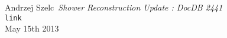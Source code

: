 


\newpage



\newpage



\newpage



\newpage



\newpage


\begin{thebibliography}{9}

Andrzej Szelc\
\emph{Shower Reconstruction Update : DocDB 2441}\\
\texttt{link}\\
May 15th 2013

\end{thebibliography}


